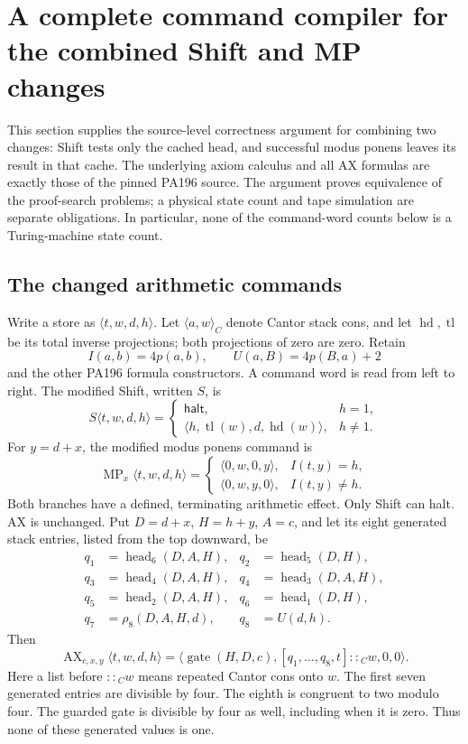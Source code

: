 \section{A complete command compiler for the combined Shift and MP changes}
\label{sec:combined-command-compiler}

This section supplies the source-level correctness argument for combining two
changes: Shift tests only the cached head, and successful modus ponens leaves
its result in that cache.  The underlying axiom calculus and all AX formulas
are exactly those of the pinned PA196 source.  The argument proves equivalence
of the proof-search problems; a physical state count and tape simulation are
separate obligations.  In particular, none of the command-word counts below
is a Turing-machine state count.

\subsection{The changed arithmetic commands}

Write a store as $\langle t,w,d,h\rangle$.  Let
$\langle a,w\rangle_C$ denote Cantor stack cons, and let
$\operatorname{hd},\operatorname{tl}$ be its total inverse projections;
both projections of zero are zero.  Retain
\[
 I(a,b)=4p(a,b),\qquad U(a,B)=4p(B,a)+2
\]
and the other PA196 formula constructors.  A command word is read from left
to right.  The modified Shift, written $S$, is
\[
 S\langle t,w,d,h\rangle=
 \begin{cases}
  \mathsf{halt},&h=1,\\
  \langle h,\operatorname{tl}(w),d,\operatorname{hd}(w)\rangle,&h\ne1.
 \end{cases}
\]
For $y=d+x$, the modified modus ponens command is
\[
 \operatorname{MP}_x\langle t,w,d,h\rangle=
 \begin{cases}
  \langle0,w,0,y\rangle,&I(t,y)=h,\\
  \langle0,w,y,0\rangle,&I(t,y)\ne h.
 \end{cases}
\]
Both branches have a defined, terminating arithmetic effect.  Only Shift
can halt.  AX is unchanged.  Put $D=d+x$, $H=h+y$, $A=c$, and let its eight
generated stack entries, listed from the top downward, be
\begin{align*}
 q_1&=\operatorname{head}_6(D,A,H),&
 q_2&=\operatorname{head}_5(D,H),\\
 q_3&=\operatorname{head}_4(D,A,H),&
 q_4&=\operatorname{head}_3(D,A,H),\\
 q_5&=\operatorname{head}_2(D,A,H),&
 q_6&=\operatorname{head}_1(D,H),\\
 q_7&=\rho_8(D,A,H,d),&q_8&=U(d,h).
\end{align*}
Then
\[
 \operatorname{AX}_{c,x,y}\langle t,w,d,h\rangle
 =\langle\operatorname{gate}(H,D,c),
       [q_1,\ldots,q_8,t]\mathbin{::}_C w,0,0\rangle.
\]
Here a list before $\mathbin{::}_C w$ means repeated Cantor cons onto $w$.
The first seven generated entries are divisible by four.  The eighth is
congruent to two modulo four.  The guarded gate is divisible by four as well,
including when it is zero.  Thus none of these generated values is one.

